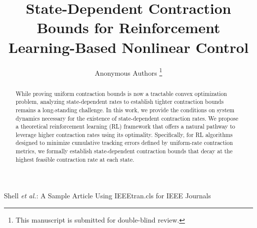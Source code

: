 \documentclass[lettersize,journal]{IEEEtran}
\begin{document}
\title{State-Dependent Contraction Bounds for Reinforcement Learning-Based Nonlinear Control}

\author{Anonymous Authors
\thanks{This manuscript is submitted for double-blind review.}%
}





%
{Shell \MakeLowercase{\textit{et al.}}: A Sample Article Using IEEEtran.cls for IEEE Journals}


\maketitle

\begin{abstract}
While proving uniform contraction bounds is now a tractable convex optimization problem, analyzing state-dependent rates to establish tighter contraction bounds remains a long-standing challenge. 
In this work, we provide the conditions on system dynamics necessary for the existence of state-dependent contraction rates. 
We propose a theoretical reinforcement learning (RL) framework that offers a natural pathway to leverage higher contraction rates using its optimality. 
Specifically, for RL algorithms designed to minimize cumulative tracking errors defined by uniform-rate contraction metrics, we formally establish state-dependent contraction bounds that decay at the highest feasible contraction rate at each state.
\end{abstract}
\end{document}
